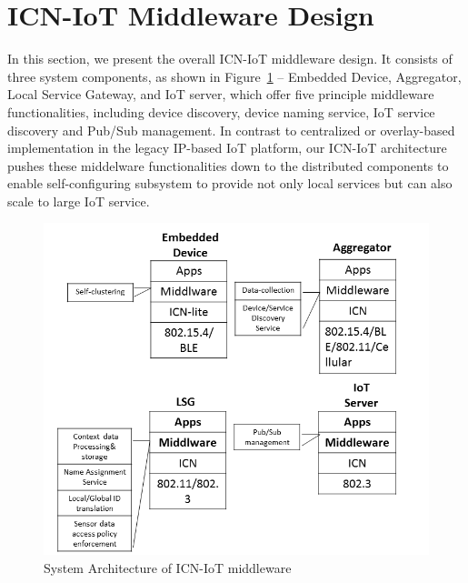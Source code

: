 \section{ICN-IoT Middleware Design}
In this section, we present the overall ICN-IoT middleware design. It consists of three system components, as shown in Figure~\ref{fig:phy} --  Embedded Device, Aggregator, Local Service Gateway, and IoT server, which offer five principle middleware functionalities, including device discovery, device naming service, IoT service discovery and Pub/Sub management.
In contrast to centralized or overlay-based implementation in the legacy IP-based IoT platform, our ICN-IoT architecture pushes these middelware functionalities down to the distributed components to enable self-configuring subsystem to provide not only local services but can also scale to large IoT service.
\begin{figure}
\includegraphics[width=\columnwidth]{figure/physical_comp.png}
\caption{\label{fig:phy}System Architecture of ICN-IoT middleware}
\end{figure}
\vspace{-1mm}
